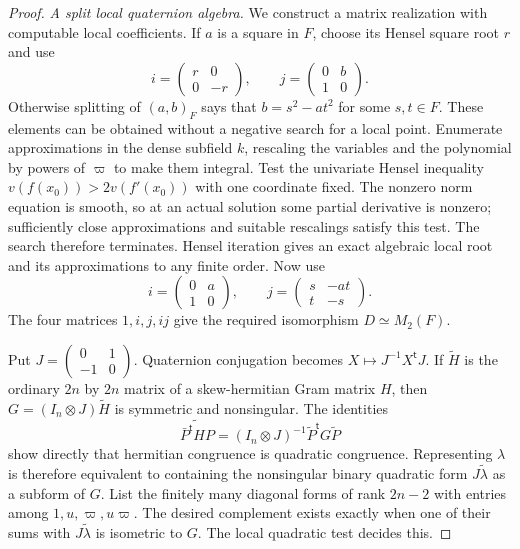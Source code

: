 \begin{proof}
\emph{A split local quaternion algebra.}
We construct a matrix realization with computable
local coefficients.
If $a$ is a square in $F$, choose its Hensel square
root $r$ and use
\[
 i=\begin{pmatrix}r&0\\0&-r\end{pmatrix},
 \qquad j=\begin{pmatrix}0&b\\1&0\end{pmatrix}.
\]
Otherwise splitting of $(a,b)_F$ says that
$b=s^2-at^2$ for some $s,t\in F$.
These elements can be obtained without a negative
search for a local point.
Enumerate approximations in the dense subfield
$k$, rescaling the variables and the polynomial
by powers of $\varpi$ to make them integral.
Test the univariate Hensel inequality
$v(f(x_0))>2v(f'(x_0))$ with one coordinate fixed.
The nonzero norm equation is smooth, so at an
actual solution some partial derivative is
nonzero; sufficiently close approximations and
suitable rescalings satisfy this test.
The search therefore terminates.
Hensel iteration gives an exact algebraic local
root and its approximations to any finite order.
Now use
\[
 i=\begin{pmatrix}0&a\\1&0\end{pmatrix},
 \qquad
 j=\begin{pmatrix}s&-at\\t&-s\end{pmatrix}.
\]
The four matrices $1,i,j,ij$ give the required
isomorphism $D\simeq M_2(F)$.

Put $J=\left(\begin{smallmatrix}0&1\\-1&0\end{smallmatrix}\right)$.
Quaternion conjugation becomes
$X\mapsto J^{-1}X^{\mathsf t}J$.
If $\widetilde H$ is the ordinary $2n$ by $2n$
matrix of a skew-hermitian Gram matrix $H$,
then
$G=(I_n\otimes J)\widetilde H$ is symmetric
and nonsingular.
The identities
\[
  \widetilde{\bar P^{\mathsf t}HP}
      =(I_n\otimes J)^{-1}\widetilde P^{\mathsf t}
        G\widetilde P
\]
show directly that hermitian congruence is
quadratic congruence.
Representing $\lambda$ is therefore equivalent
to containing the nonsingular binary quadratic
form $J\widetilde\lambda$ as a subform of $G$.
List the finitely many diagonal forms of rank
$2n-2$ with entries among
$1,u,\varpi,u\varpi$.
The desired complement exists exactly when
one of their sums with $J\widetilde\lambda$
is isometric to $G$.
The local quadratic test decides this.


\end{proof}
